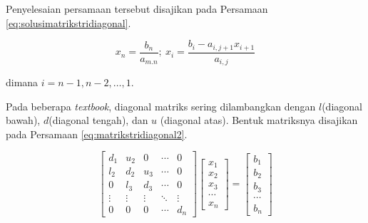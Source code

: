 \documentclass[
]{book}
\theoremstyle{definition}
\theoremstyle{definition}
\theoremstyle{definition}
\theoremstyle{definition}
\theoremstyle{remark}
\begin{document}
Penyelesaian persamaan tersebut disajikan pada Persamaan \eqref{eq:solusimatrikstridiagonal}.

\begin{equation}
x_n=\frac{b_n}{a_{m.n}};\ x_i=\frac{b_i-a_{i,j+1}x_{i+1}}{a_{i,j}}
  \label{eq:solusimatrikstridiagonal}
\end{equation}

dimana \(i=n-1,n-2,\dots,1\).

Pada beberapa \emph{textbook}, diagonal matriks sering dilambangkan dengan \(l\)(diagonal bawah), \(d\)(diagonal tengah), dan \(u\) (diagonal atas). Bentuk matriksnya disajikan pada Persamaan \eqref{eq:matrikstridiagonal2}.

\begin{equation}
\begin{bmatrix}
     d_{1} & u_{2} & 0       &\cdots& 0                 \\[0.3em]
     l_{2} & d_{2} & u_{3} &\cdots& 0             \\[0.3em]
     0       & l_{3} & d_{3} &\cdots& 0             \\[0.3em]
     \vdots  & \vdots  & \vdots  &\ddots& \vdots            \\[0.3em]
     0       & 0       & 0       &\cdots& d_{n}
     \end{bmatrix}
\begin{bmatrix}
     x_1                                          \\[0.3em]
     x_2                                          \\[0.3em]
     x_3                                          \\[0.3em]
     \cdots                                       \\[0.3em]
     x_n                                       
     \end{bmatrix}
= \begin{bmatrix}
     b_1                                          \\[0.3em]
     b_2                                          \\[0.3em]
     b_3                                          \\[0.3em]
     \cdots                                       \\[0.3em]
     b_n                                       
     \end{bmatrix}
  \label{eq:matrikstridiagonal2}
\end{equation}
\end{document}
